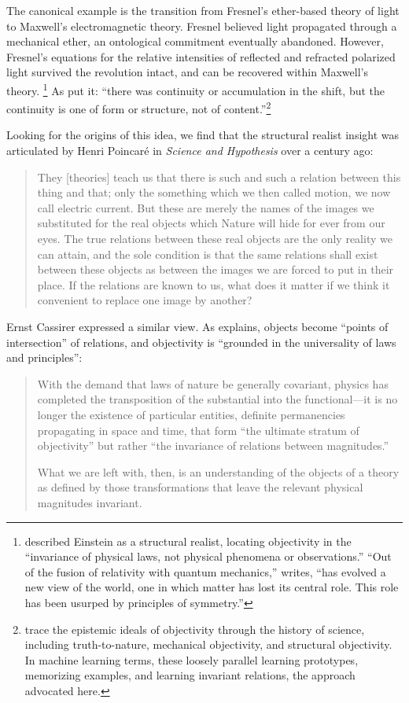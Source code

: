 The canonical example is the transition from Fresnel's ether-based theory of light to Maxwell's electromagnetic theory. Fresnel believed light propagated through a mechanical ether, an ontological commitment eventually abandoned. However, Fresnel's equations for the relative intensities of reflected and refracted polarized light survived the revolution intact, and can be recovered within Maxwell's theory.
\footnote{\citet{margenau1949} described Einstein as a structural realist, locating objectivity in the ``invariance of physical laws, not physical phenomena or observations.'' ``Out of the fusion of relativity with quantum mechanics,'' \citet[p. 1]{weinberg1992} writes, ``has evolved a new view of the world, one in which matter has lost its central role. This role has been usurped by principles of symmetry.''}
As \citet[p. 117]{worrall1989} put it: ``there was continuity or accumulation in the shift, but the continuity is one of form or structure, not of content.''\footnote{\citet{daston2007} trace the epistemic ideals of objectivity through the history of science, including truth-to-nature, mechanical objectivity, and structural objectivity. In machine learning terms, these loosely parallel learning prototypes, memorizing examples, and learning invariant relations, the approach advocated here.}

Looking for the origins of this idea, we find that the structural realist insight was articulated by Henri Poincar\'{e} in \emph{Science and Hypothesis} over a century ago:
\begin{quote}
They [theories] teach us that there is such and such a relation between this thing and that; only the something which we then called motion, we now call electric current. But these are merely the names of the images we substituted for the real objects which Nature will hide for ever from our eyes. The true relations between these real objects are the only reality we can attain, and the sole condition is that the same relations shall exist between these objects as between the images we are forced to put in their place. If the relations are known to us, what does it matter if we think it convenient to replace one image by another? \citep[p. 161]{poincare1905}
\end{quote}

Ernst Cassirer expressed a similar view. As \citet{french2001symmetry} explains, objects become ``points of intersection'' of relations, and objectivity is ``grounded in the universality of laws and principles'':
\begin{quote}
With the demand that laws of nature be generally covariant, physics has completed the transposition of the substantial into the functional---it is no longer the existence of particular entities, definite permanencies propagating in space and time, that form ``the ultimate stratum of objectivity'' but rather ``the invariance of relations between magnitudes.'' \citep{french2001symmetry}

What we are left with, then, is an understanding of the objects of a theory as defined by those transformations that leave the relevant physical magnitudes invariant. \citep{french2001symmetry}
\end{quote}

